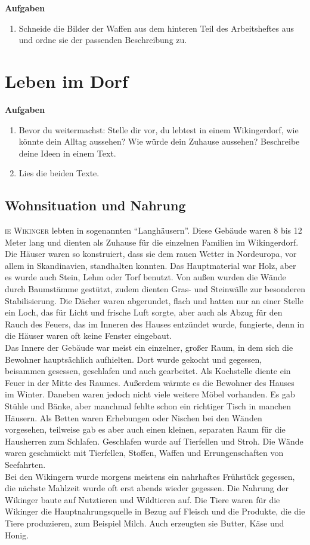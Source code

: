 \documentclass[12pt,a4paper,ngerman,openany]{book}
\newcommand{\flettrine}[2]{\lettrine[lines=2, depth=0, loversize=0.25, nindent=0.69pt, lraise=0.15]{\initfamily{#1}}{#2}}
\newcommand*\initfamily{\usefont{U}{GotIn}{xl}{n}}
\newcommand{\aufgaben}[1]{
  \begin{tcolorbox}
    \textbf{Aufgaben}
    \begin{enumerate}
      #1
    \end{enumerate}
  \end{tcolorbox}
} %
\begin{document}
\aufgaben{
  \item Schneide die Bilder der Waffen aus dem hinteren Teil des Arbeitsheftes aus und ordne sie der passenden Beschreibung zu.
}

\section{Leben im Dorf}

\aufgaben{
  \item Bevor du weitermachst: Stelle dir vor, du lebtest in einem Wikingerdorf, wie könnte dein Alltag aussehen? Wie würde dein Zuhause aussehen? Beschreibe deine Ideen in einem Text.
  \item Lies die beiden Texte.
}

\subsection{Wohnsituation und Nahrung}
\flettrine{D}{ie Wikinger} lebten in sogenannten “Langhäusern”. Diese Gebäude waren 8 bis 12 Meter lang und dienten als Zuhause für die einzelnen Familien im Wikingerdorf.  Die Häuser waren so konstruiert, dass sie dem rauen Wetter in Nordeuropa, vor allem in Skandinavien, standhalten konnten. Das Hauptmaterial war Holz, aber es wurde auch Stein, Lehm oder Torf benutzt. Von außen wurden die Wände durch Baumstämme gestützt, zudem dienten Gras- und Steinwälle zur besonderen Stabilisierung. Die Dächer waren abgerundet, flach und hatten nur an einer Stelle ein Loch, das für Licht und frische Luft sorgte, aber auch als Abzug für den Rauch des Feuers, das im Inneren des Hauses entzündet wurde,  fungierte, denn in die Häuser waren oft keine Fenster eingebaut.\\
Das Innere der Gebäude war meist ein einzelner, großer Raum, in dem sich die Bewohner hauptsächlich aufhielten. Dort wurde gekocht und gegessen, beisammen gesessen, geschlafen und auch gearbeitet. Als Kochstelle diente ein Feuer in der Mitte des Raumes. Außerdem wärmte es die Bewohner des Hauses im Winter. Daneben waren jedoch nicht viele weitere Möbel vorhanden. Es gab Stühle und Bänke, aber manchmal fehlte schon ein richtiger Tisch in manchen Häusern. Als Betten waren Erhebungen oder Nischen bei den Wänden vorgesehen, teilweise gab es aber auch einen kleinen, separaten Raum für die Hausherren zum Schlafen. Geschlafen wurde auf Tierfellen und Stroh. Die Wände waren geschmückt mit Tierfellen, Stoffen, Waffen und Errungenschaften von Seefahrten.\\
Bei den Wikingern wurde morgens meistens ein nahrhaftes Frühstück gegessen, die nächste Mahlzeit wurde oft erst abends wieder gegessen. Die Nahrung der Wikinger baute auf Nutztieren und Wildtieren auf. Die Tiere waren für die Wikinger die Hauptnahrungsquelle in Bezug auf Fleisch und die Produkte, die die Tiere produzieren, zum Beispiel Milch. Auch erzeugten sie Butter, Käse und Honig. \\
\end{document}
